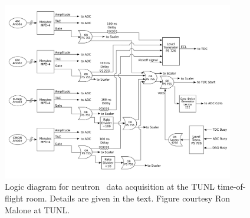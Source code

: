 \begin{figure}
    \centering
    \includegraphics[width=0.9\textwidth]{figures/ECSLogic.png}
    \caption[Logic diagram for neutron \el\ data acquisition]
    {Logic diagram for neutron \el\ data acquisition at the TUNL time-of-flight
    room. Details are given in the text. Figure courtesy Ron Malone at TUNL.}
    \label{ECSLogicDiagram}
\end{figure}
